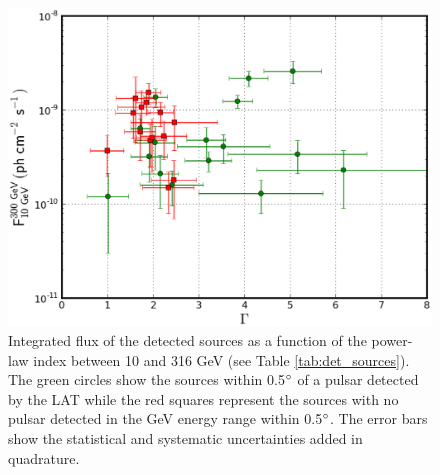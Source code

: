 \begin{figure}[h!]
\centering
\includegraphics[width=\textwidth]{figures/out_errorbar_best_fit.eps}
\caption{Integrated flux of the detected sources as a function of the power-law index between 10 and 316 GeV (see Table \ref{tab:det_sources}). The green circles show the sources within 0.5$\mbox{$^\circ$}$ of a pulsar detected by the LAT while the red squares represent the sources with no pulsar detected in the GeV energy range within 0.5$\mbox{$^\circ$}$. The error bars show the statistical and systematic uncertainties added in quadrature.  
\label{fig:fluxvssize}}
\end{figure}

